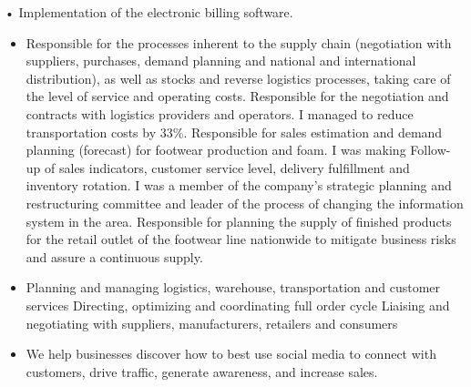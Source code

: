 \documentclass[paper=a4,fontsize=10pt,ragged2e,withhyper]{altacv}%
\begin{document}
\begin{paracol}{2}
\begin{itemize}
• Implementation of the electronic billing software. 
\end{itemize}
\divider
{}
\divider
{}
\divider
{}
\divider
{}
\divider
{}
\begin{itemize}
 \item Responsible for the processes inherent to the supply chain (negotiation with suppliers, purchases, demand planning and national and international distribution), as well as stocks and reverse logistics processes, taking care of the level of service and operating costs.\newline%
Responsible for the negotiation and contracts with logistics providers and operators. I managed to reduce transportation costs by 33\%.\newline%
Responsible for sales estimation and demand planning (forecast) for footwear production and foam.\newline%
I was making Follow{-}up of sales indicators, customer service level, \newline%
delivery fulfillment and inventory rotation.\newline%
I was a member of the company's strategic planning and restructuring committee and leader of the process of changing the information system in the area.\newline%
Responsible for planning the supply of finished products for the retail outlet of the footwear line nationwide to mitigate business risks and assure a continuous supply. 
\end{itemize}
\divider
{}
\begin{itemize}
 \item Planning and managing logistics, warehouse, transportation and customer services\newline%
Directing, optimizing and coordinating full order cycle\newline%
Liaising and negotiating with suppliers, manufacturers, retailers and consumers 
\end{itemize}
\divider
{}
\begin{itemize}
 \item We help businesses discover how to best use social media to connect with customers, drive traffic, generate awareness, and increase sales.\newline%

\end{itemize}
\end{paracol}
\end{document}
